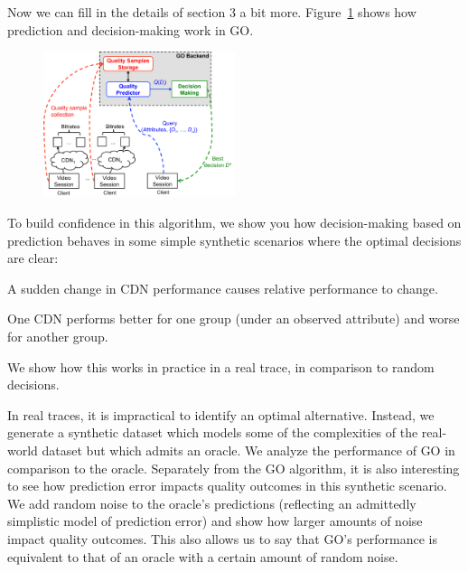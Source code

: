 Now we can fill in the details of section 3 a bit more.  Figure~\ref{fig:go-overview} shows how prediction and decision-making work in GO.
\begin{figure}[h!]
\centering
 \includegraphics[width=0.5\textwidth] {figures/go-overview.pdf}
\label{fig:go-overview}
\end{figure}

To build confidence in this algorithm, we show you how decision-making based on prediction behaves in some simple synthetic scenarios where the optimal decisions are clear:
\begin{packedenumerate}
  \item A sudden change in CDN performance causes relative performance to change.
  \item One CDN performs better for one group (under an observed attribute) and worse for another group.
\end{packedenumerate}

We show how this works in practice in a real trace, in comparison to random decisions.

In real traces, it is impractical to identify an optimal alternative.  Instead, we generate a synthetic dataset which models some of the complexities of the real-world dataset but which admits an oracle.  We analyze the performance of GO in comparison to the oracle.  Separately from the GO algorithm, it is also interesting to see how prediction error impacts quality outcomes in this synthetic scenario.  We add random noise to the oracle’s predictions (reflecting an admittedly simplistic model of prediction error) and show how larger amounts of noise impact quality outcomes.  This also allows us to say that GO’s performance is equivalent to that of an oracle with a certain amount of random noise.
